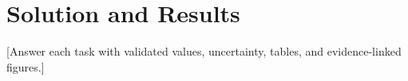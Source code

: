 \section{Solution and Results}
[Answer each task with validated values, uncertainty, tables, and evidence-linked figures.]
